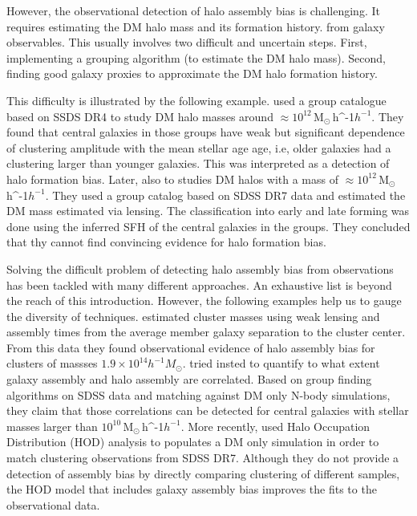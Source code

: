 \documentclass[fleqn,usenatbib]{mnras}
\newcommand{\Msunh}{\,{\rm M}$_{\odot}$\,\ifmmode h^{-1}\else $h^{-1}$\fi}
\begin{document}
However, the observational detection of halo assembly bias is challenging.
It requires estimating the DM halo mass and its formation history.
from galaxy observables.
This usually involves two difficult and uncertain steps.
First, implementing a grouping algorithm (to estimate the DM halo
mass). 
Second, finding good galaxy proxies to approximate the DM halo
formation history.   

This difficulty is illustrated by the following example.
\citet{Lacerna_2014} used a group catalogue based on SSDS DR4
to study DM halo masses around $\approx 10^{12}$\Msunh. 
They found that central galaxies in those groups have weak but
significant dependence of clustering amplitude with the mean stellar
age age, i.e, older galaxies had a clustering larger than younger
galaxies. This was interpreted as a detection of halo formation bias.
Later, \citet{2016ApJ...819..119L} also to studies DM halos with a
mass of $\approx 10^{12}$\Msunh. 
They used a group catalog based on SDSS DR7 data  and estimated the DM
mass estimated via lensing.
The classification into early and late forming was done using  the
inferred SFH of the central galaxies in the groups.  
They concluded that thy cannot find convincing evidence for halo
formation bias.  

Solving the difficult problem of detecting halo assembly bias from
observations has been tackled with many different approaches. 
An exhaustive list is beyond the reach of this introduction.
However, the following examples  help us to gauge the diversity of techniques.
\citet{2016PhRvL.116d1301M} estimated cluster masses using weak lensing and
assembly times from the average member galaxy separation to the cluster center. 
From this data they found observational evidence of halo assembly bias
for clusters of massses $1.9\times 10^{14}h^{-1}M_\odot$.
\citet{2018MNRAS.478.4487T} tried insted to quantify to what extent
galaxy assembly and halo assembly are correlated.
Based on group finding algorithms on SDSS data and matching against DM
only N-body simulations, they claim that those correlations can be detected for central
galaxies with stellar masses larger than $10^{10}$\Msunh. 
More recently, \citet{2019MNRAS.485.1196Z} used Halo Occupation
Distribution (HOD) analysis to populates a DM only simulation in order
to match clustering observations from SDSS DR7. 
Although they do not provide a detection of assembly bias by directly
comparing clustering of different samples, 
the HOD model that includes galaxy assembly bias improves the fits to
the observational data. 
\end{document}
